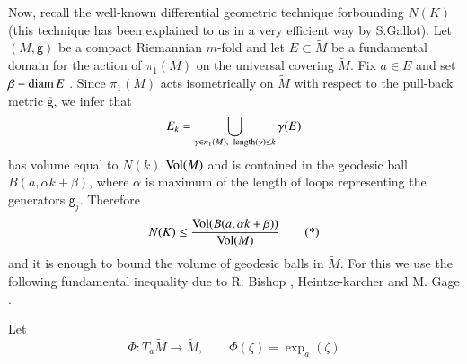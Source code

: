 Now, recall the well-known differential geometric technique for\break bounding $N(K)$ (this technique has been explained to us in a very efficient way by S.Gallot). Let $(M, \mathsf{g})$ be a compact Riemannian $m$-fold and let $E\subset \widetilde{M}$ be a fundamental domain for the action of $\pi_{1}(M)$ on the universal covering $\widetilde{M}$. Fix $a\in E$ and set $\beta - \operatorname{diam} E$ . Since $\pi_{1}(M)$ acts isometrically on $\widetilde{M}$ with respect to the pull-back metric $\overline{\mathsf{g}}$, we infer that
$$
E_{k} = \bigcup\limits_{\gamma\in \pi_{1}(M),\;\; \operatorname{length}(\gamma)\leq k} \gamma(E)
$$
has volume equal to $N(k)$ $\operatorname{Vol}(M)$ and is contained in the geodesic ball $B(a, \alpha k + \beta)$, where $\alpha$ is maximum of the length of loops representing the generators $\mathsf{g}_{j}$. Therefore
\begin{equation}
N(K) \leq \dfrac{\operatorname{Vol}(B(a, \alpha k + \beta))}{\operatorname{Vol}(M)} \tag{*}\label{eq:sample2}
\end{equation}
and it is enough to bound the volume of geodesic balls in $\widetilde{M}$. For this we use the following fundamental inequality due to R. Bishop \cite{art5-keyBi63}, Heintze-karcher \cite{art5-keyHK78} and M. Gage \cite{art5-keyGa80}.

\begin{lem}
Let
$$
\Phi : T_{a}\widetilde{M} \rightarrow \widetilde{M},\qquad \Phi(\zeta)= \exp_{a}(\zeta)
$$ 
\end{lem}
